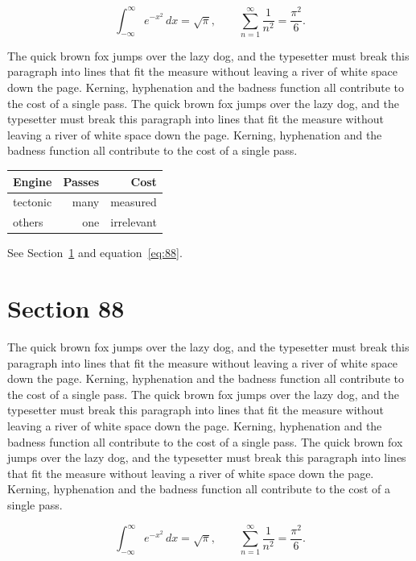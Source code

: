 \documentclass{article}
\begin{document}
\begin{equation}\label{eq:87}
\int_{-\infty}^{\infty} e^{-x^{2}}\,dx = \sqrt{\pi}, \qquad
\sum_{n=1}^{\infty} \frac{1}{n^{2}} = \frac{\pi^{2}}{6}.
\end{equation}

The quick brown fox jumps over the lazy dog, and the typesetter must break this paragraph into lines that fit the measure without leaving a river of white space down the page. Kerning, hyphenation and the badness function all contribute to the cost of a single pass. The quick brown fox jumps over the lazy dog, and the typesetter must break this paragraph into lines that fit the measure without leaving a river of white space down the page. Kerning, hyphenation and the badness function all contribute to the cost of a single pass. 

\begin{center}
\begin{tabular}{lrr}
\toprule
Engine & Passes & Cost \\
\midrule
tectonic & many & measured \\
others & one & irrelevant \\
\bottomrule
\end{tabular}
\end{center}

See Section~\ref{sec:88} and equation~\eqref{eq:88}.
\section{Section 88}
\label{sec:88}
The quick brown fox jumps over the lazy dog, and the typesetter must break this paragraph into lines that fit the measure without leaving a river of white space down the page. Kerning, hyphenation and the badness function all contribute to the cost of a single pass. The quick brown fox jumps over the lazy dog, and the typesetter must break this paragraph into lines that fit the measure without leaving a river of white space down the page. Kerning, hyphenation and the badness function all contribute to the cost of a single pass. The quick brown fox jumps over the lazy dog, and the typesetter must break this paragraph into lines that fit the measure without leaving a river of white space down the page. Kerning, hyphenation and the badness function all contribute to the cost of a single pass. 

\begin{equation}\label{eq:88}
\int_{-\infty}^{\infty} e^{-x^{2}}\,dx = \sqrt{\pi}, \qquad
\sum_{n=1}^{\infty} \frac{1}{n^{2}} = \frac{\pi^{2}}{6}.
\end{equation}
\end{document}
